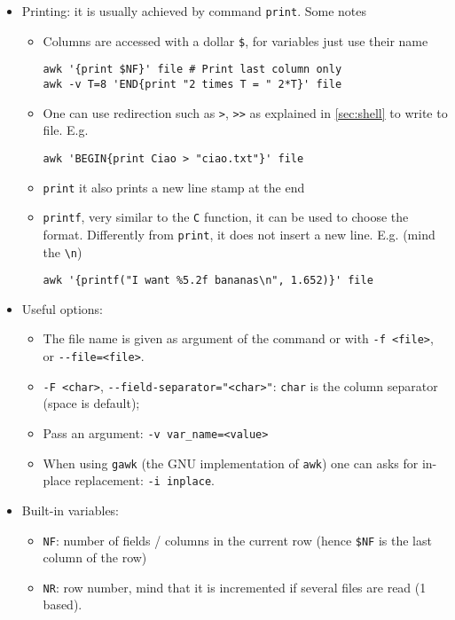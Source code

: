 \documentclass[a4paper,12pt,%
              final%
              ]{article}
\begin{document}
\begin{itemize}
  \item Printing: it is usually achieved by command \texttt{print}. Some notes
    \begin{itemize}
      \item Columns are accessed with a dollar \verb|$|, for variables just use their name
\begin{verbatim}
awk '{print $NF}' file # Print last column only
awk -v T=8 'END{print "2 times T = " 2*T}' file
\end{verbatim}
      \item One can use redirection such as \verb|>|, \verb|>>| as explained in \autoref{sec:shell} to write to file. E.g.
\begin{verbatim}
awk 'BEGIN{print Ciao > "ciao.txt"}' file
\end{verbatim}
      \item \texttt{print} it also prints a new line stamp at the end
      \item \texttt{printf}, very similar to the \texttt{C} function, it can be used to choose the format. Differently from \texttt{print}, it does not insert a new line. E.g. (mind the \verb|\n|)
\begin{verbatim}
awk '{printf("I want %5.2f bananas\n", 1.652)}' file
\end{verbatim}
    \end{itemize}
  \item Useful options:
    \begin{itemize}
      \item The file name is given as argument of the command or with \verb|-f <file>|, or \verb|--file=<file>|.
      \item \verb|-F <char>|, \verb|--field-separator="<char>"|: \verb|char| is the column separator (space is default);
      \item Pass an argument: \verb|-v var_name=<value>|
      \item When using \texttt{gawk} (the GNU implementation of \texttt{awk}) one can asks for in-place replacement: \verb|-i inplace|.
    \end{itemize}
  \item Built-in variables:
    \begin{itemize}
      \item \verb|NF|: number of fields / columns in the current row (hence \verb|$NF| is the last column of the row)
      \item \verb|NR|: row number, mind that it is incremented if several files are read (1 based).

\end{itemize}
\end{itemize}
\end{document}
